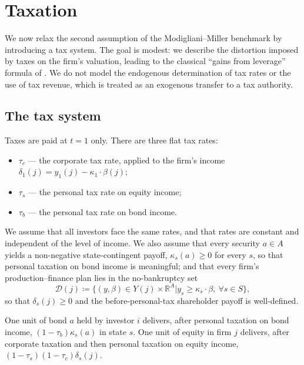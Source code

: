 \documentclass[11pt,a4paper,oneside]{book}
\def\R{\mathbb{R}}
\def\geq{\geqslant}
\theoremstyle{plain}
\theoremstyle{definition}
\theoremstyle{remark}
\numberwithin{equation}{chapter}
\begin{document}
\section{Taxation}
\label{sec:tax}

We now relax the second assumption of the Modigliani--Miller benchmark by introducing a tax system.
The goal is modest: we describe the distortion imposed by taxes on the firm's valuation, leading to the classical ``gains from leverage'' formula of \citet{ModiglianiMiller1958, Miller1977}.
We do not model the endogenous determination of tax rates or the use of tax revenue, which is treated as an exogenous transfer to a tax authority.

\subsection{The tax system}

Taxes are paid at $t=1$ only.
There are three flat tax rates:
\begin{itemize}
  \item $\tau_c$ --- the corporate tax rate, applied to the firm's income $\delta_1(j) = y_1(j) - \kappa_1 \cdot \beta(j)$;
  \item $\tau_s$ --- the personal tax rate on equity income;
  \item $\tau_b$ --- the personal tax rate on bond income.
\end{itemize}
We assume that all investors face the same rates, and that rates are constant and independent of the level of income.
We also assume that every security $a \in A$ yields a non-negative state-contingent payoff, $\kappa_s(a) \geq 0$ for every $s$, so that personal taxation on bond income is meaningful; and that every firm's production--finance plan lies in the no-bankruptcy set
\begin{equation*}
  \mathcal{D}(j) \coloneqq \bigl\{ (y, \beta) \in Y(j) \times \R^A \vert y_s \geq \kappa_s \cdot \beta, \ \forall s \in S \bigr\},
\end{equation*}
so that $\delta_s(j) \geq 0$ and the before-personal-tax shareholder payoff is well-defined.

One unit of bond $a$ held by investor $i$ delivers, after personal taxation on bond income, $(1-\tau_b) \kappa_s(a)$ in state $s$.
One unit of equity in firm $j$ delivers, after corporate taxation and then personal taxation on equity income, $(1-\tau_s)(1-\tau_c) \delta_s(j)$.
\end{document}
